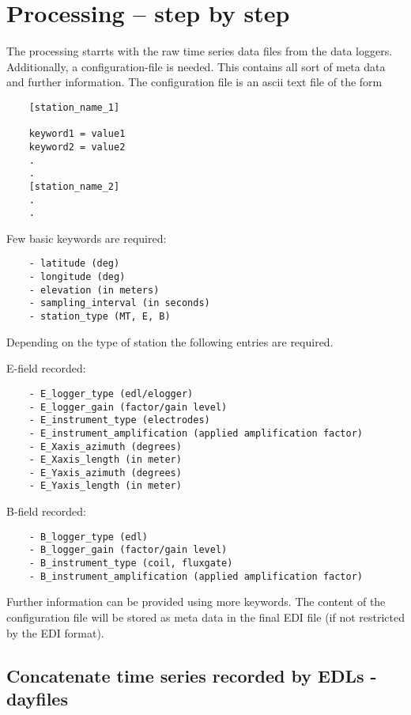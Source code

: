 
\section{Processing -- step by step}
\label{sec:processing.steps}

The processing starrts with the raw time series data files from the data loggers. 
Additionally, a configuration-file is needed. This contains all sort of meta data and further information.
The configuration file is an ascii text file of the form\\
\begin{verbatim}
    [station_name_1]
    
    keyword1 = value1
    keyword2 = value2
    .
    .
    [station_name_2]
    .
    .
\end{verbatim}
Few basic keywords are required:
\begin{verbatim}
    - latitude (deg)
    - longitude (deg)
    - elevation (in meters)
    - sampling_interval (in seconds)
    - station_type (MT, E, B)
\end{verbatim}

    Depending on the type of station the following entries are required.

    E-field recorded:
\begin{verbatim}
    - E_logger_type (edl/elogger)
    - E_logger_gain (factor/gain level)
    - E_instrument_type (electrodes)
    - E_instrument_amplification (applied amplification factor)
    - E_Xaxis_azimuth (degrees)
    - E_Xaxis_length (in meter)
    - E_Yaxis_azimuth (degrees)
    - E_Yaxis_length (in meter)
\end{verbatim}

    B-field recorded:
\begin{verbatim}
    - B_logger_type (edl)
    - B_logger_gain (factor/gain level)
    - B_instrument_type (coil, fluxgate)
    - B_instrument_amplification (applied amplification factor)

\end{verbatim}

Further information can be provided using more keywords. The content of the configuration file will be stored as meta data in the final EDI file (if not restricted by the EDI format).


\subsection{Concatenate time series recorded by EDLs - dayfiles}

